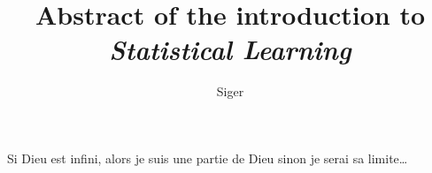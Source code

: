 \documentclass[a4paper, 10pt]{report}
\title{Abstract of the introduction to \emph{Statistical Learning}}
\author{Siger}
\begin{document}
\maketitle

Si Dieu est infini, alors je suis une partie de Dieu sinon je serai sa limite\ldots

\tableofcontents
\end{document}
